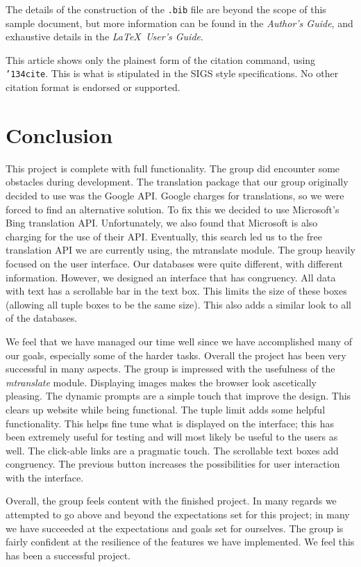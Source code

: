 \documentclass{sig-alternate-05-2015}
\begin{document}
The details of the construction of the \texttt{.bib} file
are beyond the scope of this sample document, but more
information can be found in the \textit{Author's Guide},
and exhaustive details in the \textit{\LaTeX\ User's
Guide}\cite{Lamport:LaTeX}.

This article shows only the plainest form
of the citation command, using \texttt{{\char'134}cite}.
This is what is stipulated in the SIGS style specifications.
No other citation format is endorsed or supported.
\fi


\section{Conclusion}

This project is complete with full functionality. The group did encounter some obstacles during development. The translation package that our group originally decided to use was the Google API. Google charges for translations, so we were forced to find an alternative solution. To fix this we decided to use Microsoft's Bing translation API. Unfortunately, we also found that Microsoft is also charging for the use of their API. Eventually, this search led us to the free translation API we are currently using, the mtranslate module. The group heavily focused on the user interface. Our databases were quite different, with different information. However, we designed an interface that has congruency. All data with text has a scrollable bar in the text box. This limits the size of these boxes (allowing all tuple boxes to be the same size). This also adds a similar look to all of the databases. 

We feel that we have managed our time well since we have accomplished many of our goals, especially some of the harder tasks. Overall the project has been very successful in many aspects. The group is impressed with the usefulness of the \textit{mtranslate}\cite{mtranslate} module. Displaying images makes the browser look ascetically pleasing. The dynamic prompts are a simple touch that improve the design. This clears up website while being functional. The tuple limit adds some helpful functionality. This helps fine tune what is displayed on the interface; this has been extremely useful for testing and will most likely be useful to the users as well. The click-able links are a pragmatic touch. The scrollable text boxes add congruency. The previous button increases the possibilities for user interaction with the interface. 

Overall, the group feels content with the finished project. In many regards we attempted to go above and beyond the expectations set for this project; in many we have succeeded at the expectations and goals set for ourselves. The group is fairly confident at the resilience of the features we have implemented. We feel this has been a successful project.  
\end{document}
